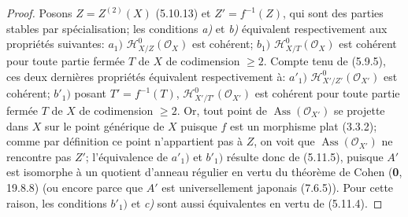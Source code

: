 \begin{proof}
Posons $Z=Z^{(2)}(X)$ (5.10.13) et $Z'=f^{-1}(Z)$, qui sont des parties
stables par spécialisation; les conditions \emph{a)} et \emph{b)} équivalent
respectivement aux propriétés suivantes:
$a_1)$ $\mathscr H^0_{X/Z}(\mathscr O_X)$ est cohérent;
$b_1)$ $\mathscr H^0_{X/T}(\mathscr O_X)$ est cohérent pour toute partie
fermée $T$ de $X$ de codimension $\geqslant2$.
Compte tenu de (5.9.5), ces deux dernières propriétés équivalent
respectivement à:
$a'_1)$ $\mathscr H^0_{X'/Z'}(\mathscr O_{X'})$ est cohérent;
$b'_1)$ posant $T'=f^{-1}(T)$,
$\mathscr H^0_{X'/T'}(\mathscr O_{X'})$ est cohérent pour toute partie
fermée $T$ de $X$ de codimension $\geqslant2$.
Or, tout point de $\operatorname{Ass}(\mathscr O_{X'})$ se projette dans
$X$ sur le point générique de $X$ puisque $f$ est un morphisme plat
(3.3.2); comme par définition ce point n'appartient pas à $Z$, on voit que
$\operatorname{Ass}(\mathscr O_{X'})$ ne rencontre pas $Z'$;
l'équivalence de $a'_1)$ et $b'_1)$ résulte donc de (5.11.5), puisque $A'$
est isomorphe à un quotient d'anneau régulier en vertu du théorème de Cohen
(\textbf{0}, 19.8.8) (ou encore
parce que $A'$ est universellement japonais (7.6.5)). Pour cette raison,
les conditions $b'_1)$ et \emph{c)} sont aussi équivalentes en vertu de (5.11.4).
\end{proof}

